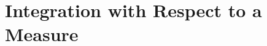 \documentclass[11pt,fleqn]{book} %
\begin{document}













\chapter{Integration with Respect to a Measure}



\end{document}
